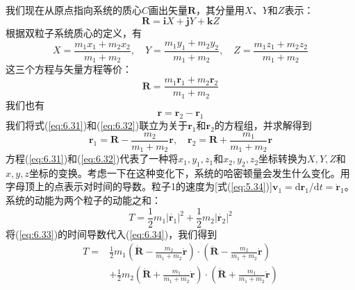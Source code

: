     我们现在从原点指向系统的质心$C$画出矢量$\mathbf{R}$，其分量用$X$、$Y$和$Z$表示：
    \begin{equation}
        \mathbf{R} = \mathbf{i}X + \mathbf{j}Y + \mathbf{k}Z
        \label{eq:6.29}
    \end{equation}
    根据双粒子系统质心的定义，有
    \begin{equation}
        X = \frac{m_1x_1 + m_2x_2}{m_1 + m_2}, \quad Y = \frac{m_1y_1 + m_2y_2}{m_1 + m_2}, \quad Z = \frac{m_1z_1 + m_2z_2}{m_1 + m_2}
        \label{eq:6.30}
    \end{equation}
    这三个方程与矢量方程等价：
    \begin{equation}
        \mathbf{R} = \frac{m_1\mathbf{r}_1 + m_2\mathbf{r}_2}{m_1 + m_2}
        \label{eq:6.31}
    \end{equation}
    我们也有
    \begin{equation}
        \mathbf{r} = \mathbf{r}_2 - \mathbf{r}_1
        \label{eq:6.32}
    \end{equation}
    我们将式(\ref{eq:6.31})和(\ref{eq:6.32})联立为关于$\mathbf{r}_1$和$\mathbf{r}_2$的方程组，并求解得到
    \begin{equation}
        \mathbf{r}_1 = \mathbf{R} - \frac{m_2}{m_1 + m_2}\mathbf{r}, \quad \mathbf{r}_2 = \mathbf{R} + \frac{m_1}{m_1 + m_2}\mathbf{r}
        \label{eq:6.33}
    \end{equation}
    方程(\ref{eq:6.31})和(\ref{eq:6.32})代表了一种将$x_1,y_1,z_1$和$x_2,y_2,z_2$坐标转换为$X,Y,Z$和$x,y,z$坐标的变换。考虑一下在这种变化下，系统的哈密顿量会发生什么变化。用字母顶上的点表示对时间的导数。粒子1的速度为[式(\ref{eq:5.34})]$\mathbf{v}_1 = \mathrm{d}\mathbf{r}_1/\mathrm{d}t = \dot{\mathbf{r}}_1$。系统的动能为两个粒子的动能之和：
    \begin{equation}
        T = \frac{1}{2}m_1\left|\dot{\mathbf{r}_1}\right|^2 + \frac{1}{2}m_2\left|\dot{\mathbf{r}_2}\right|^2
        \label{eq:6.34}
    \end{equation}
    将(\ref{eq:6.33})的时间导数代入(\ref{eq:6.34})，我们得到
    \begin{equation*}
        \begin{aligned}
            T = & \frac{1}{2}m_1\left(\dot{\mathbf{R}} - \frac{m_2}{m_1+m_2}\dot{\mathbf{r}}\right)\cdot \left(\dot{\mathbf{R}} - \frac{m_2}{m_1+m_2}\dot{\mathbf{r}}\right) \\
            & + \frac{1}{2}m_2\left(\dot{\mathbf{R}} + \frac{m_1}{m_1+m_2}\dot{\mathbf{r}}\right)\cdot \left(\dot{\mathbf{R}} + \frac{m_1}{m_1+m_2}\dot{\mathbf{r}}\right) \\
        \end{aligned}
    \end{equation*}
